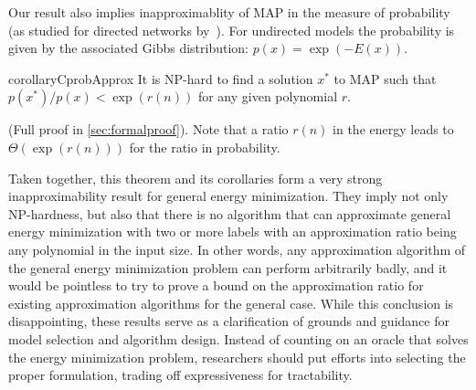  Our result also implies inapproximablity of MAP in the measure of probability (as studied for directed networks by~\citet{Kwisthout-13}). For undirected models the probability is given by the associated Gibbs distribution: $p(x) = \exp(-E(x))$.
 \begin{restatable}{corollary}{CprobApprox}\label{C:prob-approx}
 It is NP-hard to find a solution $x^*$ to MAP such that $p(x^*)/p(x) < \exp(r(n))$ for any given polynomial $r$.
 \end{restatable}
 \begin{proofsketch}
 (Full proof in \cref{sec:formalproof}). Note that a ratio $r(n)$ in the energy leads to $\Theta(\exp(r(n)))$ for the ratio in probability.
 \end{proofsketch}

Taken together, this theorem and its corollaries form a very strong inapproximability result for general energy minimization. They imply not only NP-hardness, but also that there is no algorithm that can approximate general energy minimization with two or more labels with an approximation ratio being any polynomial in the input size. In other words, any approximation algorithm of the general energy minimization problem can perform arbitrarily badly, and it would be pointless to try to prove a bound on the approximation ratio for existing approximation algorithms for the general case.  While this conclusion is disappointing, these results serve as a clarification of grounds and guidance for model selection and algorithm design. Instead of counting on an oracle that solves the energy minimization problem, researchers should put efforts into selecting the proper formulation, trading off expressiveness for tractability. %

